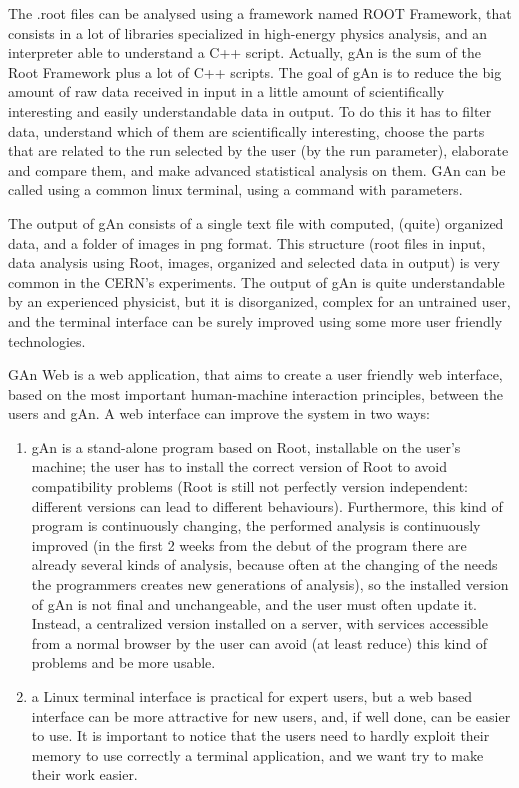 The .root files can be analysed using a framework named ROOT Framework, that consists in a lot of libraries specialized in high-energy physics analysis, and an interpreter able to understand a C++ script.
Actually, gAn is the sum of the Root Framework plus a lot of C++ scripts.
The goal of gAn is to reduce the big amount of raw data received in input in a little amount of scientifically interesting and easily understandable data in output. To do this it has to filter data, understand which of them are scientifically interesting, choose the parts that are related to the run selected by the user (by the run parameter), elaborate and compare them, and make advanced statistical analysis on them.  
GAn can be called using a common linux terminal, using a command with parameters. 

The output of gAn consists of a single text file with computed, (quite) organized data, and a folder of images in png format.
This structure (root files in input, data analysis using Root, images, organized and selected data in output) is very common in the CERN's experiments. 
The output of gAn is quite understandable by an experienced physicist, but it is disorganized, complex for an untrained user, and the terminal interface can be surely improved using some more user friendly technologies.

GAn Web is a web application, that aims to create a user friendly web interface, based on the most important human-machine interaction principles, between the users and gAn.
A web interface can improve the system in two ways:

\begin{enumerate}

\item gAn is a stand-alone program based on Root, installable on the user's machine; the user has to install the correct version of Root to avoid compatibility problems (Root is still not perfectly version independent: different versions can lead to different behaviours). Furthermore, this kind of program is continuously changing, the performed analysis is continuously improved (in the first 2 weeks from the debut of the program there are already several kinds of analysis, because often at the changing of the needs the programmers creates new generations of analysis), so the installed version of gAn is not final and unchangeable, and the user must often update it. Instead, a centralized version installed on a server, with services accessible from a normal browser by the user can avoid (at least reduce) this kind of problems and be more usable.    
 

\item a Linux terminal interface is practical for expert users, but a web based interface can be more attractive for new users, and, if well done, can be easier to use. It is important to notice that the users need to hardly exploit their memory to use correctly a terminal application, and we want try to make their work easier.


\end{enumerate}


